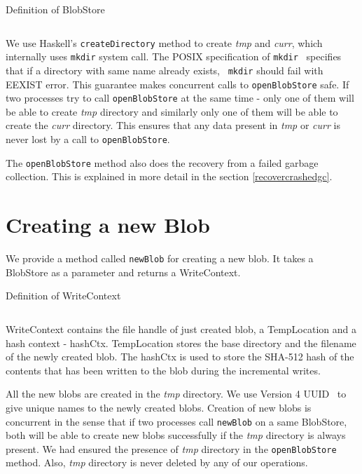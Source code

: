 \begin{program}
  \caption{Definition of BlobStore}
  \label{prog:defblobstore}
  \inputminted{haskell}{hs/blobstore.hs}
\end{program}

We use Haskell's \texttt{createDirectory} method to create \textit{tmp} and \textit{curr}, which internally uses \texttt{mkdir} system call.
The POSIX specification of \texttt{mkdir}~\cite{mkdirposix} specifies that if a directory with same name already exists, ~\texttt{mkdir} should fail with EEXIST error.
This guarantee makes concurrent calls to \texttt{openBlobStore} safe. If two processes try to call \texttt{openBlobStore} at the same time - only one of them will be able to create \textit{tmp} directory and similarly only one of them will be able to create the \textit{curr} directory.
This ensures that any data present in \textit{tmp} or \textit{curr} is never lost by a call to \texttt{openBlobStore}.

The \texttt{openBlobStore} method also does the recovery from a failed garbage collection. This is explained in more detail in the section \ref{recovercrashedgc}.

\section{Creating a new Blob}
We provide a method called \texttt{newBlob} for creating a new blob. It takes a BlobStore as a parameter and returns a WriteContext.

\begin{program}
  \caption{Definition of WriteContext}
  \label{prog:defwritecontext}
  \inputminted{haskell}{hs/writecontext.hs}
\end{program}

WriteContext contains the file handle of just created blob, a TempLocation and a hash context - hashCtx. TempLocation stores the base directory and the filename of the newly created blob. The hashCtx is used to store the SHA-512 hash of the contents that has been written to the blob during the incremental writes.

All the new blobs are created in the \textit{tmp} directory. We use Version 4 UUID~\cite{leach2005universally} to give unique names to the newly created blobs.
Creation of new blobs is concurrent in the sense that if two processes call \texttt{newBlob} on a same BlobStore, both will be able to create new blobs successfully if the \textit{tmp} directory is always present. We had ensured the presence of \textit{tmp} directory in the \texttt{openBlobStore} method. Also, \textit{tmp} directory is never deleted by any of our operations.

